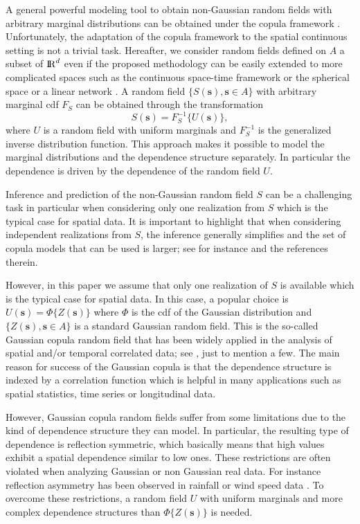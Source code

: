 \documentclass[times,sort&compress,3p]{elsarticle}
\theoremstyle{plain}%
\theoremstyle{definition}
\def\ss{\bm{s}}
\def\R{{\rm I\! R}}
\begin{document}
A general powerful modeling tool to obtain  non-Gaussian random fields  with arbitrary marginal distributions can be obtained under the copula framework \citep{Joe:2014}. Unfortunately, the adaptation of the copula framework to the spatial continuous setting  is not a trivial task.
Hereafter, we consider random fields defined on   $A$ a subset of $\R^d$  even if the proposed methodology can be easily extended to
more complicated spaces such as the continuous space-time framework \citep{Gneiting:2002} or the spherical space \citep{gneiting2013,porcubev} or  a linear network \citep{andmo}.
 A random field $\{S(\ss), \ss \in A\}$  with arbitrary marginal cdf $F_{S}$ can be obtained through the transformation
\begin{equation*}\label{copula1}
S(\ss)=F_{S}^{-1}\{U(\ss)\},
\end{equation*}
where $U$ is a random field with uniform marginals and  $F_{S}^{-1}$
is the generalized inverse distribution function. This approach makes it possible to model the marginal distributions and the dependence structure separately.  In particular the dependence is driven by the dependence of the random field $U$.

Inference and prediction of the non-Gaussian random field $S$ can be a challenging task in particular when considering only one realization
from $S$ which is the typical case for spatial data.
It is important to highlight that when  considering independent realizations from $S$, the inference generally simplifies and the set of copula models that can be used is  larger; see for instance \cite{Gentcop} and the references therein.

However, in this paper we assume that only one  realization of $S$ is available which is the typical case for spatial data.
In this case, a popular choice is $U(\ss)=\Phi\{ Z(\ss) \}$ where $\Phi$ is the cdf of the Gaussian distribution and $\{Z(\ss), \ss \in A\}$ is a standard Gaussian random field. This is  the so-called Gaussian copula random field that has been widely applied in the analysis of spatial and/or temporal correlated data; see \citep{bardossy2006copula,Kazianka:Pilz:2010,Masarotto:Varin:2012,graler2014modelling,guolo2014beta,DeOliveira:2006},  just to mention a few. The main reason for success of the Gaussian copula is that the dependence structure is indexed by a correlation function which is helpful in many applications such as spatial statistics, time series or longitudinal data.

However, Gaussian copula random fields suffer from some limitations due to the kind of dependence structure they can model. In particular, the resulting type of dependence is reflection symmetric, which basically means that high values exhibit a spatial dependence similar to low ones. These restrictions are often violated when analyzing Gaussian or non Gaussian real data. For instance  reflection asymmetry has been observed in rainfall or wind speed data \citep{bardossy2006copula,SUROSO2018685,bevilacqua2020modeling}. To overcome these restrictions, a random field $U$ with uniform marginals and more complex dependence structures than $\Phi\{Z(\ss)\}$ is needed.
\end{document}
